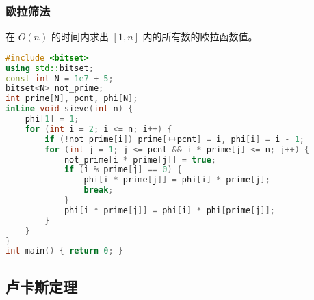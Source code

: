 \documentclass[9pt, a4paper, oneside]{book}
\begin{document}
\subsubsection{欧拉筛法}
在 $O(n)$ 的时间内求出 $[1, n]$ 内的所有数的欧拉函数值。
\begin{lstlisting}[language={C++}]
#include <bitset>
using std::bitset;
const int N = 1e7 + 5;
bitset<N> not_prime;
int prime[N], pcnt, phi[N];
inline void sieve(int n) {
    phi[1] = 1;
    for (int i = 2; i <= n; i++) {
        if (!not_prime[i]) prime[++pcnt] = i, phi[i] = i - 1;
        for (int j = 1; j <= pcnt && i * prime[j] <= n; j++) {
            not_prime[i * prime[j]] = true;
            if (i % prime[j] == 0) {
                phi[i * prime[j]] = phi[i] * prime[j];
                break;
            }
            phi[i * prime[j]] = phi[i] * phi[prime[j]];
        }
    }
}
int main() { return 0; }\end{lstlisting}
\subsection{卢卡斯定理}
\end{document}
